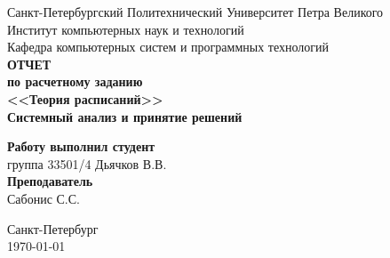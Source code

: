 \begin{titlepage}
\begin{center}
	Санкт-Петербургский Политехнический Университет Петра Великого\\[0.3cm]
	Институт компьютерных наук и технологий \\[0.3cm]
	Кафедра компьютерных систем и программных технологий\\[4cm]
	
	\textbf{ОТЧЕТ}\\ 
	\textbf{по расчетному заданию}\\[0.5cm]
	\textbf{<<Теория расписаний>>}\\[0.1cm]
	\textbf{Системный анализ и принятие решений}\\[4.0cm]
\end{center}

\begin{flushright}
	\begin{minipage}{0.45\textwidth}
		\textbf{Работу выполнил студент}\\[3mm]
		группа 33501/4 \hspace*{6mm} Дьячков В.В.\\[5mm]
		\textbf{Преподаватель}\\[5mm]
		\sign[3.5cm] \hspace*{5mm} Сабонис С.С. \\[5mm]
	\end{minipage}
\end{flushright}

\vfill

\begin{center}
	Санкт-Петербург\\
	\today
\end{center}
\end{titlepage}

\addtocounter{page}{1}